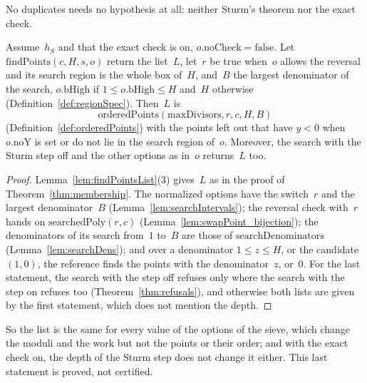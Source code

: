 No duplicates needs no hypothesis at all: neither Sturm's theorem nor the exact check.

\begin{theorem}\label{thm:order}
  \leanok
  Assume~$h_S$ and that the exact check is on, $o.\mathrm{noCheck} = \mathrm{false}$. Let
  $\mathrm{findPoints}(c, H, s, o)$ return the list~$L$, let~$r$ be true when~$o$ allows the
  reversal and its search region is the whole box of~$H$, and~$B$ the largest denominator of the
  search, $o.\mathrm{bHigh}$ if $1 \le o.\mathrm{bHigh} \le H$ and~$H$ otherwise
  (Definition~\ref{def:regionSpec}). Then~$L$ is
  \[ \mathrm{orderedPoints}(\mathrm{maxDivisors}, r, c, H, B) \]
  (Definition~\ref{def:orderedPoints}) with the points left out that have $y < 0$
  when~$o.\mathrm{noY}$ is set or do not lie in the search region of~$o$. Moreover, the search with
  the Sturm step off and the other options as in~$o$ returns~$L$ too.
\end{theorem}

\begin{proof}
  \leanok
  Lemma~\ref{lem:findPointsList}(3) gives~$L$ as in the proof of Theorem~\ref{thm:membership}. The
  normalized options have the switch~$r$ and the largest denominator~$B$
  (Lemma~\ref{lem:searchIntervals}); the reversal check with~$r$ hands on
  $\mathrm{searchedPoly}(r, c)$ (Lemma~\ref{lem:swapPoint_bijection}); the denominators of its
  search from~$1$ to~$B$ are those of $\mathrm{searchDenominators}$ (Lemma~\ref{lem:searchDens});
  and over a denominator $1 \le z \le H$, or the candidate $(1, 0)$, the reference finds the points
  with the denominator~$z$, or~$0$. For the last statement, the search with the step off refuses
  only where the search with the step on refuses too (Theorem~\ref{thm:refusals}), and otherwise
  both lists are given by the first statement, which does not mention the depth.
\end{proof}

So the list is the same for every value of the options of the sieve, which change the moduli and the
work but not the points or their order; and with the exact check on, the depth of the Sturm step
does not change it either. This last statement is proved, not certified.

